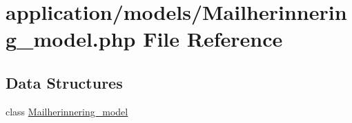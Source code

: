 \hypertarget{_mailherinnering__model_8php}{}\section{application/models/\+Mailherinnering\+\_\+model.php File Reference}
\label{_mailherinnering__model_8php}
\subsection*{Data Structures}
\begin{DoxyCompactItemize}
\item 
class \mbox{\hyperlink{class_mailherinnering__model}{Mailherinnering\+\_\+model}}
\end{DoxyCompactItemize}
